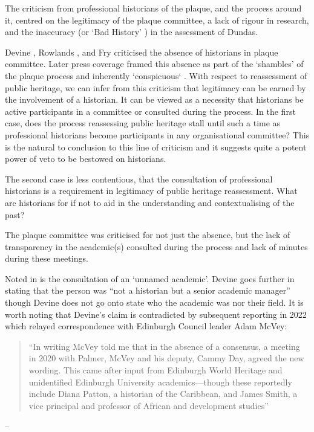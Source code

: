 \documentclass{scrartcl}
\renewcommand{\cite}{\parencite}
\begin{document}
The criticism from professional historians of the plaque, and the process around it, centred on the legitimacy of the plaque committee, a lack of rigour in research, and the inaccuracy (or `Bad History' \cite[][]{mccarthy_2022_1}) in the assessment of Dundas.

Devine \cite[][]{devine_2020}, Rowlands \cite[][]{rowlands_2021}, and Fry \cite[][]{fry_2020} criticised the absence of historians in plaque committee.
Later press coverage framed this absence as part of the `shambles' of the plaque process and inherently `conspicuous` \cite[][]{scotsman_2022}.
With respect to reassessment of public heritage, we can infer from this criticism that legitimacy can be earned by the involvement of a historian. It can be viewed as a necessity that historians be active participants in a committee or consulted during the process.
In the first case, does the process reassessing public heritage stall until such a time as professional historians become participants in any organisational committee?
This is the natural to conclusion to this line of criticism and it suggests quite a potent power of veto to be bestowed on historians.

The second case is less contentious, that the consultation of professional historians is a requirement in legitimacy of public heritage reassessment. What are historians for if not to aid in the understanding and contextualising of the past?

The plaque committee was criticised for not just the absence, but the lack of transparency in the academic(s) consulted during the process and lack of minutes during these meetings.

Noted in \cite[][]{devine_2020,scotsman_2022,rowlands_2021,fry_2020} is the consultation of an `unnamed academic'. Devine goes further in stating that the person was ``not a historian but a senior academic manager'' \cite[][]{devine_2020} though Devine does not go onto state who the academic was nor their field. 
It is worth noting that Devine's claim is contradicted by subsequent reporting in 2022 which relayed correspondence with Edinburgh Council leader Adam McVey:

\begin{quotation}
    ``In writing McVey told me that in the absence of a consensus, a meeting in 2020 with Palmer, McVey and his deputy, Cammy Day, agreed the new wording. This came after input from Edinburgh World Heritage and unidentified Edinburgh University academics—though these reportedly include Diana Patton, a historian of the Caribbean, and James Smith, a vice principal and professor of African and development studies''
\end{quotation}
\begin{flushright}
-- \cite[][]{lloyd_2022}
\end{flushright}
\end{document}

